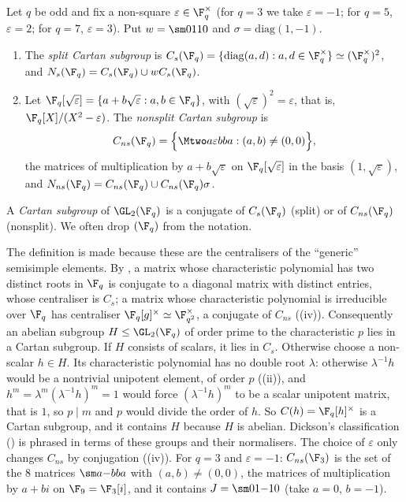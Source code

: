 \begin{definition}\label{def:groups:cartan}
Let $q$ be odd and fix a non-square $\varepsilon\in\F_q^\times$ (for $q=3$ we take $\varepsilon=-1$; for $q=5$, $\varepsilon=2$; for $q=7$, $\varepsilon=3$). Put
$w=\sm0110$ and $\sigma=\mathrm{diag}(1,-1)$.
\begin{enumerate}[label=(\roman*)]
\item The \emph{split Cartan subgroup} is $C_s(\F_q)=\{\mathrm{diag}(a,d):a,d\in\F_q^\times\}\simeq(\F_q^\times)^2$, and $N_s(\F_q)=C_s(\F_q)\cup wC_s(\F_q)$.
\item Let $\F_q[\sqrt\varepsilon]=\{a+b\sqrt\varepsilon:a,b\in\F_q\}$, with $(\sqrt\varepsilon)^2=\varepsilon$, that is, $\F_q[X]/(X^2-\varepsilon)$. The \emph{nonsplit Cartan subgroup} is
\[
C_{ns}(\F_q)=\Bigl\{\Mtwo a{\varepsilon b}ba:(a,b)\ne(0,0)\Bigr\},
\]
the matrices of multiplication by $a+b\sqrt\varepsilon$ on $\F_q[\sqrt\varepsilon]$ in the basis $(1,\sqrt\varepsilon)$, and $N_{ns}(\F_q)=C_{ns}(\F_q)\cup C_{ns}(\F_q)\sigma$.
\end{enumerate}
A \emph{Cartan subgroup} of $\GL_2(\F_q)$ is a conjugate of $C_s(\F_q)$ (split) or of $C_{ns}(\F_q)$ (nonsplit). We often drop $(\F_q)$ from the notation.
\end{definition}

The definition is made because these are the centralisers of the ``generic'' semisimple elements. By , a matrix whose characteristic
polynomial has two distinct roots in $\F_q$ is conjugate to a diagonal matrix with distinct entries, whose centraliser is $C_s$; a matrix whose characteristic
polynomial is irreducible over $\F_q$ has centraliser $\F_q[g]^\times\simeq\F_{q^2}^\times$, a conjugate of $C_{ns}$ ((iv)). Consequently an abelian
subgroup $H\le\GL_2(\F_q)$ of order prime to the characteristic $p$ lies in a Cartan subgroup. If $H$ consists of scalars, it lies in $C_s$. Otherwise choose a
non-scalar $h\in H$. Its characteristic polynomial has no double root $\lambda$: otherwise $\lambda^{-1}h$ would be a nontrivial unipotent element, of order $p$
((ii)), and $h^m=\lambda^m(\lambda^{-1}h)^m=1$ would force $(\lambda^{-1}h)^m$ to be a scalar unipotent matrix, that is $1$, so $p\mid m$ and
$p$ would divide the order of $h$. So $C(h)=\F_q[h]^\times$ is a Cartan subgroup, and it contains $H$ because $H$ is abelian. Dickson's classification () is phrased in terms of these
groups and their normalisers. The choice of $\varepsilon$ only changes $C_{ns}$ by conjugation ((iv)). For $q=3$ and $\varepsilon=-1$:
$C_{ns}(\F_3)$ is the set of the $8$ matrices $\sm a{-b}ba$ with $(a,b)\ne(0,0)$, the matrices of multiplication by $a+bi$ on $\F_9=\F_3[i]$, and it contains
$J=\sm01{-1}0$ (take $a=0$, $b=-1$).

